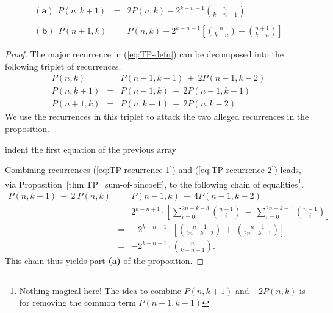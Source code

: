 \begin{prop}
\label{thm:successor-TP-values}
\begin{eqnarray*}
\nonumber
\mathbf{(a)} \ \
P(n, k+1) & = & 
  2 P(n,k) - 2^{k-n+1} {n \choose {k-n+1}} \\
\label{eq:successor-TP-values}
          &   & \\
\nonumber
\mathbf{(b)} \ \
P(n+1, k) & = &
  P(n,k) + 2^{k-n-1} \left[ {n \choose {k-n}} + {{n+1} \choose {k-n}} \right]
\end{eqnarray*}
\end{prop}

\begin{proof}
The major recurrence in (\ref{eq:TP-defn}) can be decomposed into the
following triplet of recurrences.
\begin{eqnarray}
\label{eq:TP-recurrence-1}
P(n, k)   & = & P(n-1, k-1) \ + \ 2 P(n-1, k-2) \\
\label{eq:TP-recurrence-2}
P(n, k+1) & = & P(n-1, k) \ + \ 2 P(n-1, k-1) \\
\label{eq:TP-recurrence-3}
P(n+1, k) & = & P(n, k-1) \ + \ 2 P(n, k-2)
\end{eqnarray}
We use the recurrences in this triplet to attack the two alleged
recurrences in the proposition.

{\Denis indent the first equation of the previous array}
\medskip

Combining recurrences (\ref{eq:TP-recurrence-1}) and
(\ref{eq:TP-recurrence-2}) leads, via
Proposition~\ref{thm:TP=sum-of-bincoeff}, to the following chain of
equalities\footnote{Nothing magical here! The idea to combine $P(n, k+1)$ and $-2 P(n, k)$
is for removing the common term $P(n-1, k-1)$}.
\begin{eqnarray*}
P(n, k+1) \ - \ 2 \ P(n, k)
  & = &
P(n-1, k) \ - \ 4 P(n-1, k-2) \\
  & = &
2^{k-n+1} \cdot \left[
\sum_{i=0}^{2n-k-3} {{n-1} \choose i} \ - \
\sum_{i=0}^{2n-k-1} {{n-1} \choose i}
\right] \\
  & = & 
- 2^{k-n+1} \cdot \left[
{{n-1} \choose {2n-k-2}} \ + \ {{n-1} \choose {2n-k-1}}
\right] \\
  & = &
- 2^{k-n+1} \cdot {n \choose k-n+1}.
\end{eqnarray*}
This chain thus yields part {\bf (a)} of the proposition.

\medskip


\end{proof}

